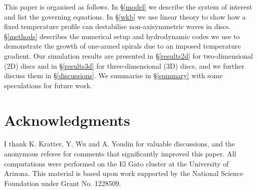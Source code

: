 \documentclass[useAMS,usenatbib]{mn2e}
\begin{document}
This paper is organised as follows. In \S\ref {model} we describe the system of interest
and list the governing equations. In \S\ref{wkb} we use linear theory  to show
  how a fixed temperature profile 
  can destabilise non-axisymmetric waves in discs. \S\ref{methods} describes
the numerical setup and hydrodynamic codes we use to 
  demonstrate the growth of one-armed spirals due to an imposed
  temperature gradient. Our
  simulation results are presented in  \S\ref{results2d} for two-dimensional (2D) 
  discs and in \S\ref{results3d} for three-dimensional (3D) discs, and we further
discuss them in \S\ref{discussions}. We summarise in \S\ref{summary}  
with some speculations for future work. 








\section*{Acknowledgments}
I thank K. Kratter, Y. Wu and A. Youdin for valuable discussions, and the
anonymous referee for comments that significantly improved this paper. All
computations were performed on the El Gato cluster at the University
of Arizona. This material is based upon work supported by the National
Science Foundation under Grant No. 1228509. 




\appendix

\end{document}

